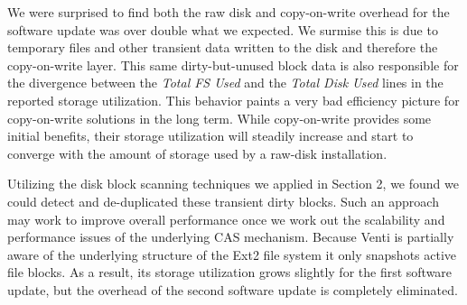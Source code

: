 We were surprised to find both the raw disk and copy-on-write overhead for the
software update was over double what we expected.  
We surmise this is due to temporary files and other transient data written
to the disk and therefore the copy-on-write layer.
This same dirty-but-unused block data is also responsible for the 
divergence between the \emph{Total FS Used} and the \emph{Total Disk Used} 
lines in the reported storage utilization.
This behavior paints a very bad efficiency picture for copy-on-write 
solutions in the long term.
While copy-on-write provides some initial benefits, their storage utilization
will steadily increase and start to converge with the amount of
storage used by a raw-disk installation.

Utilizing the disk block scanning techniques we applied in Section 2, we
found we could detect and de-duplicated these transient dirty blocks.
Such an approach may work to improve overall performance once we work out
the scalability and performance issues of the underlying CAS mechanism.
Because Venti is partially aware of the underlying structure of the Ext2
file system it only snapshots active file blocks.  
As a result, its storage utilization grows slightly for the
first software update, but the overhead of the second software update is
completely eliminated. 

